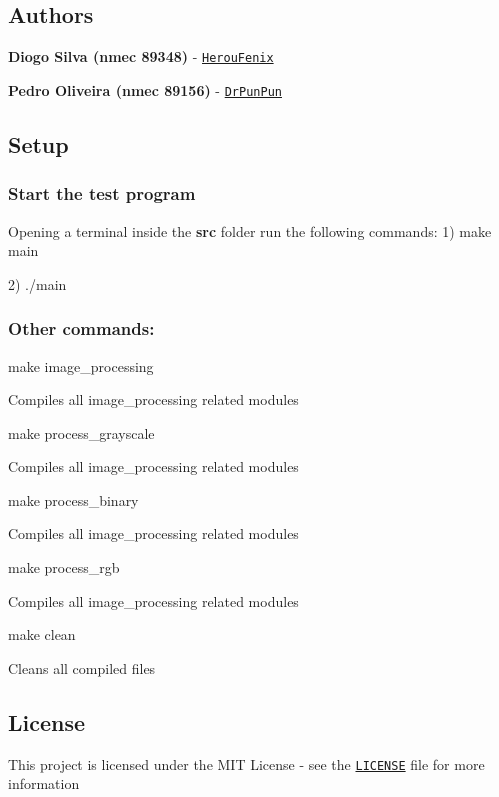 \subsection*{Authors}


\begin{DoxyItemize}
\item {\bfseries Diogo Silva (nmec 89348)} -\/ \href{https://github.com/HerouFenix}{\tt Herou\+Fenix}
\item {\bfseries Pedro Oliveira (nmec 89156)} -\/ \href{https://github.com/DrPunPun}{\tt Dr\+Pun\+Pun}
\end{DoxyItemize}

\subsection*{Setup}

\subsubsection*{Start the test program}

Opening a terminal inside the {\bfseries src} folder run the following commands\+: 1) make main

2) ./main

\subsubsection*{Other commands\+:}


\begin{DoxyItemize}
\item make image\+\_\+processing
\begin{DoxyItemize}
\item Compiles all image\+\_\+processing related modules
\end{DoxyItemize}
\item make process\+\_\+grayscale
\begin{DoxyItemize}
\item Compiles all image\+\_\+processing related modules
\end{DoxyItemize}
\item make process\+\_\+binary
\begin{DoxyItemize}
\item Compiles all image\+\_\+processing related modules
\end{DoxyItemize}
\item make process\+\_\+rgb
\begin{DoxyItemize}
\item Compiles all image\+\_\+processing related modules
\end{DoxyItemize}
\item make clean
\begin{DoxyItemize}
\item Cleans all compiled files
\end{DoxyItemize}
\end{DoxyItemize}

\subsection*{License}

This project is licensed under the M\+IT License -\/ see the \href{https://github.com/heroufenix/image-processing-using-c/blob/master/LICENSE}{\tt L\+I\+C\+E\+N\+SE} file for more information 